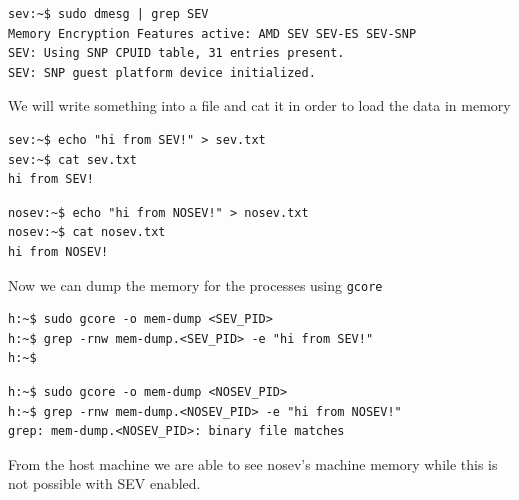 \documentclass[twocolumn]{article}
\begin{document}
    \begin{verbatim}
sev:~$ sudo dmesg | grep SEV
Memory Encryption Features active: AMD SEV SEV-ES SEV-SNP
SEV: Using SNP CPUID table, 31 entries present.
SEV: SNP guest platform device initialized.
    \end{verbatim}

    We will write something into a file and cat it in order to load the data in memory

    \begin{verbatim}
sev:~$ echo "hi from SEV!" > sev.txt
sev:~$ cat sev.txt
hi from SEV!
    \end{verbatim}

    \begin{verbatim}
nosev:~$ echo "hi from NOSEV!" > nosev.txt
nosev:~$ cat nosev.txt
hi from NOSEV!
    \end{verbatim}

Now we can dump the memory for the processes using \texttt{gcore}

    \begin{verbatim}
h:~$ sudo gcore -o mem-dump <SEV_PID>
h:~$ grep -rnw mem-dump.<SEV_PID> -e "hi from SEV!"
h:~$
    \end{verbatim}

    \begin{verbatim}
h:~$ sudo gcore -o mem-dump <NOSEV_PID>
h:~$ grep -rnw mem-dump.<NOSEV_PID> -e "hi from NOSEV!"
grep: mem-dump.<NOSEV_PID>: binary file matches
    \end{verbatim}

    From the host machine we are able to see nosev's machine memory while this is not possible with SEV enabled.
\end{document}
